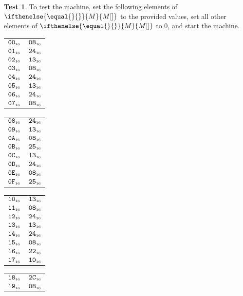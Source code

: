 \documentclass[a4paper,12pt]{article}
\makeatletter
\newcommand{\num}[1]{\texttt{#1}}
\newcommand{\hex}[1]{\num{#1}_{\textup{\tiny 16}}}
\newcommand{\MEM}[1]{\ifthenelse{\equal{#1}{}}{M}{M[#1]}}
\theoremstyle{definition}
\newtheorem{test}{Test}
\newenvironment{memtable}{%
  \begin{trivlist}
    \item
    }{%
    \end{trivlist}}
\newenvironment{memcolumn}{%
  \begin{tabular}{@{}ll@{}}
    \hline}
    {%
    \hline
  \end{tabular}}
\newcommand{\memspace}{\qquad}
\makeatother
\begin{document}
\begin{test}
  To test the machine, set the following elements of $\MEM{}$ to the provided values, set all other elements of $\MEM{}$ to 0, and start the machine.
  \begin{memtable}
    \begin{memcolumn}
      $\hex{00}$ & $\hex{08}$ \\
      $\hex{01}$ & $\hex{24}$ \\
      $\hex{02}$ & $\hex{13}$ \\
      $\hex{03}$ & $\hex{08}$ \\
      $\hex{04}$ & $\hex{24}$ \\
      $\hex{05}$ & $\hex{13}$ \\
      $\hex{06}$ & $\hex{24}$ \\
      $\hex{07}$ & $\hex{08}$ \\
    \end{memcolumn}
    \memspace
    \begin{memcolumn}
      $\hex{08}$ & $\hex{24}$ \\
      $\hex{09}$ & $\hex{13}$ \\
      $\hex{0A}$ & $\hex{08}$ \\
      $\hex{0B}$ & $\hex{25}$ \\
      $\hex{0C}$ & $\hex{13}$ \\
      $\hex{0D}$ & $\hex{24}$ \\
      $\hex{0E}$ & $\hex{08}$ \\
      $\hex{0F}$ & $\hex{25}$ \\
    \end{memcolumn}
    \memspace
    \begin{memcolumn}
      $\hex{10}$ & $\hex{13}$ \\
      $\hex{11}$ & $\hex{08}$ \\
      $\hex{12}$ & $\hex{24}$ \\
      $\hex{13}$ & $\hex{13}$ \\
      $\hex{14}$ & $\hex{24}$ \\
      $\hex{15}$ & $\hex{08}$ \\
      $\hex{16}$ & $\hex{22}$ \\
      $\hex{17}$ & $\hex{10}$ \\
    \end{memcolumn}
    \memspace
    \begin{memcolumn}
      $\hex{18}$ & $\hex{2C}$ \\
      $\hex{19}$ & $\hex{08}$ \\

\end{memcolumn}
\end{memtable}
\end{test}
\end{document}
